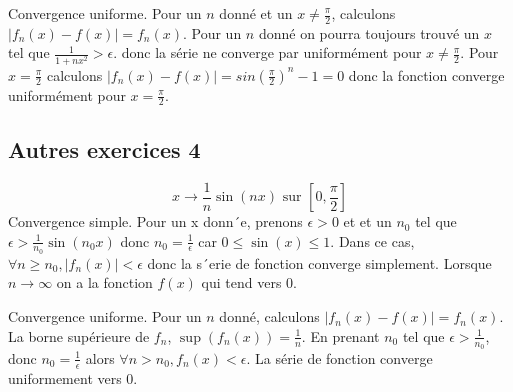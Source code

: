 \documentclass[]{book}
\theoremstyle{definition}
\begin{document}
Convergence uniforme. Pour un $n$ donn\'e et un $x \neq \frac{\pi}{2}$, calculons $|f_n(x) - f(x)| = f_n(x)$. Pour un $n$ donn\'e on pourra toujours trouv\'e un $x$ tel que $\frac{1}{1+nx^2} > \epsilon$. donc la s\'erie ne converge par uniform\'ement pour $x \neq \frac{\pi}{2}$. Pour $x=\frac{\pi}{2}$ calculons $|f_n(x) - f(x)| = sin(\frac{\pi}{2})^{n} -1 = 0$ donc la fonction converge uniform\'ement pour $x=\frac{\pi}{2}$.


\subsection*{Autres exercices 4}
$$x \to \frac{1}{n}\sin(nx) \text{ sur } [0,\frac{\pi}{2}]$$
Convergence simple. Pour un x donn´e, prenons $\epsilon> $0 et et un $n_0$ tel que $\epsilon > \frac{1}{n_0}\sin(n_0x)$ donc $n_0 = \frac{1}{\epsilon}$ car $0 \leq \sin(x) \leq 1$. Dans ce cas, $\forall n \geq n_0, |f_n(x)| < \epsilon$ donc la s´erie de fonction converge simplement. Lorsque $n \to \infty$ on a la fonction $f(x)$ qui tend vers 0.

Convergence uniforme. Pour un $n$ donn\'e, calculons $|f_n(x) - f(x)| = f_n(x)$. La borne sup\'erieure de $f_n$, $\sup(f_n(x)) = \frac{1}{n}$. En prenant $n_0$ tel que $\epsilon > \frac{1}{n_0}$, donc $n_0 = \frac{1}{\epsilon}$ alors $\forall n > n_0, f_n(x) < \epsilon$. La s\'erie de fonction converge uniformement vers 0.
\end{document}
